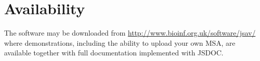 \documentclass[a4]{article}
\begin{document}
\section{Availability}
The software may be downloaded from
\url{http://www.bioinf.org.uk/software/jsav/} where demonstrations,
including the ability to upload your own MSA, are available together
with full documentation implemented with JSDOC.


\end{document}
